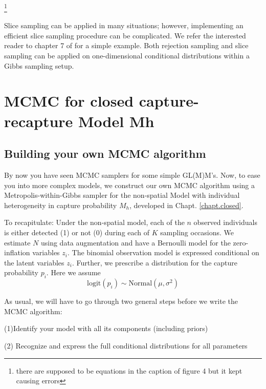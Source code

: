 \footnote{there are supposed to be equations in the caption of figure
4 but it kept causing errors}

Slice sampling can be applied in many situations; however, implementing an efficient slice sampling procedure can be complicated. We refer the interested reader to chapter 7 of \citet{robert_casella:2010} for a simple example.
Both rejection sampling and slice sampling can be applied on one-dimensional conditional distributions within a Gibbs sampling setup.

\section{MCMC for closed capture-recapture Model Mh}
\subsection{Building your own MCMC algorithm}

By now you have seen MCMC samplers for some simple GL(M)M's. Now, to ease you into more complex models, we construct our own MCMC algorithm using a Metropolis-within-Gibbs sampler for the non-spatial Model with individual heterogeneity in capture probability $M_{h}$, developed in Chapt. \ref{chapt.closed}. 

To recapitulate: Under the non-spatial model, each of the $n$ observed individuals is either detected (1) or not (0) during each of $K$ sampling occasions. We estimate $N$ using data augmentation and have a Bernoulli model for the
zero-inflation variables $z_{i}$. The binomial observation model
is expressed conditional on the latent variables
$z_{i}$. Further, we
prescribe a distribution for the capture probability $p_{i}$. Here we assume
\[
\mathrm{logit}(p_{i}) \sim \mbox{Normal}(\mu,\sigma^2)
\]


As usual, we will have to go through two general steps before we write the MCMC algorithm:

(1)Identify your model with all its components (including
    priors)

(2) Recognize and express the full conditional distributions for
    all parameters
    
